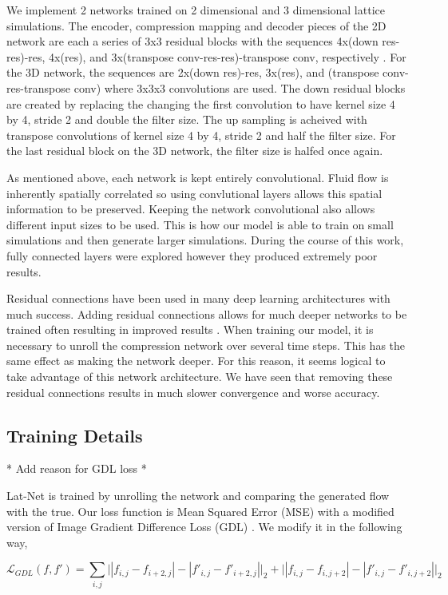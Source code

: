 \documentclass{article}
\begin{document}
We implement 2 networks trained on 2 dimensional and 3 dimensional lattice simulations. The encoder, compression mapping and decoder pieces of the 2D network are each a series of 3x3 residual blocks with the sequences 4x(down res-res)-res, 4x(res), and 3x(transpose conv-res-res)-transpose conv, respectively \cite{he2016deep}. For the 3D network, the sequences are 2x(down res)-res, 3x(res), and (transpose conv-res-transpose conv) where 3x3x3 convolutions are used. The down residual blocks are created by replacing the changing the first convolution to have kernel size 4 by 4, stride 2 and double the filter size. The up sampling is acheived with transpose convolutions of kernel size 4 by 4, stride 2 and half the filter size. For the last residual block on the 3D network, the filter size is halfed once again.

As mentioned above, each network is kept entirely convolutional. Fluid flow is inherently spatially correlated so using convlutional layers allows this spatial information to be preserved. Keeping the network convolutional also allows different input sizes to be used. This is how our model is able to train on small simulations and then generate larger simulations. During the course of this work, fully connected layers were explored however they produced extremely poor results.

Residual connections have been used in many deep learning architectures with much success. Adding residual connections allows for much deeper networks to be trained often resulting in improved results \cite{he2016deep}. When training our model, it is necessary to unroll the compression network over several time steps. This has the same effect as making the network deeper. For this reason, it seems logical to take advantage of this network architecture. We have seen that removing these residual connections results in much slower convergence and worse accuracy.

\subsection{Training Details}
*
Add reason for GDL loss
*


Lat-Net is trained by unrolling the network and comparing the generated flow with the true. Our loss function is Mean Squared Error (MSE) with a modified version of Image Gradient Difference Loss (GDL) \cite{mathieu2015deep}. We modify it in the following way,

\begin{equation}
  \mathcal{L}_{GDL}(f,f') = \sum_{i,j} \big||f_{i,j} - f_{i+2,j}| - |f'_{i,j} - f'_{i+2,j}| \big|_{2} + \big||f_{i,j} - f_{i,j+2}| - |f'_{i,j} - f'_{i,j+2}| \big|_{2}
\end{equation}
\end{document}
